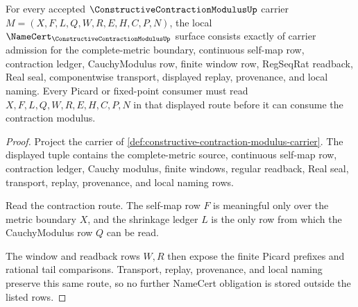 \begin{theorem}
\label{thm:constructive-contraction-modulus-namecert-obligations}
For every accepted $\ConstructiveContractionModulusUp$ carrier $M=(X,F,L,Q,W,R,E,H,C,P,N)$, the local $\NameCert_{\ConstructiveContractionModulusUp}$ surface consists exactly of carrier admission for the complete-metric boundary, continuous self-map row, contraction ledger, CauchyModulus row, finite window row, RegSeqRat readback, Real seal, componentwise transport, displayed replay, provenance, and local naming. Every Picard or fixed-point consumer must read $X,F,L,Q,W,R,E,H,C,P,N$ in that displayed route before it can consume the contraction modulus.
\end{theorem}
\begin{proof}
Project the carrier of \autoref{def:constructive-contraction-modulus-carrier}. The displayed tuple contains the complete-metric source, continuous self-map row, contraction ledger, Cauchy modulus, finite windows, regular readback, Real seal, transport, replay, provenance, and local naming rows.

Read the contraction route. The self-map row $F$ is meaningful only over the metric boundary $X$, and the shrinkage ledger $L$ is the only row from which the CauchyModulus row $Q$ can be read.

The window and readback rows $W,R$ then expose the finite Picard prefixes and rational tail comparisons. Transport, replay, provenance, and local naming preserve this same route, so no further NameCert obligation is stored outside the listed rows.
\end{proof}


